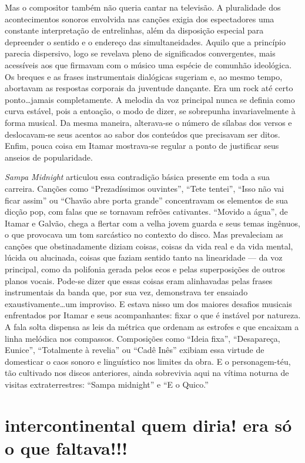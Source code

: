 Mas o compositor também não queria cantar na televisão. A pluralidade
dos acontecimentos sonoros envolvida nas canções exigia dos espectadores
uma constante interpretação de entrelinhas, além da disposição especial
para depreender o sentido e o endereço das simultaneidades. Aquilo que a
princípio parecia dispersivo, logo se revelava pleno de significados
convergentes, mais acessíveis aos que firmavam com o músico uma espécie
de comunhão ideológica. Os breques e as frases instrumentais dialógicas
sugeriam e, ao mesmo tempo, abortavam as respostas corporais da
juventude dançante. Era um rock até certo ponto\ldots jamais completamente.
A melodia da voz principal nunca se definia como curva estável, pois a
entoação, o modo de dizer, se sobrepunha invariavelmente à forma
musical. Da mesma maneira, alterava-se o número de sílabas dos versos e
deslocavam-se seus acentos ao sabor dos conteúdos que precisavam ser
ditos. Enfim, pouca coisa em Itamar mostrava-se regular a ponto de
justificar seus anseios de popularidade.

\textit{Sampa Midnight} articulou essa contradição básica presente em toda a sua
carreira. Canções como ``Prezadíssimos ouvintes'', ``Tete tentei'', ``Isso não vai
ficar assim'' ou ``Chavão abre porta grande'' concentravam os elementos de sua
dicção pop, com falas que se tornavam refrões cativantes. ``Movido a água'', de Itamar e Galvão, chega a flertar com a velha jovem guarda e seus temas
ingênuos, o que provocava um tom sarcástico no contexto do disco. Mas
prevaleciam as canções que obstinadamente diziam coisas, coisas da vida
real e da vida mental, lúcida ou alucinada, coisas que faziam sentido
tanto na linearidade --- da voz principal, como da polifonia gerada pelos
ecos e pelas superposições de outros planos vocais. Pode-se dizer que
essas coisas eram alinhavadas pelas frases instrumentais da banda que,
por sua vez, demonstrava ter ensaiado exaustivamente\ldots um improviso. E
estava nisso um dos maiores desafios musicais enfrentados por Itamar e
seus acompanhantes: fixar o que é instável por natureza. A fala solta
dispensa as leis da métrica que ordenam as estrofes e que encaixam a
linha melódica nos compassos. Composições como ``Ideia fixa'', ``Desapareça,
Eunice'', ``Totalmente à revelia'' ou ``Cadê Inês'' exibiam essa virtude de
domesticar o caos sonoro e linguístico nos limites da obra. E o
personagem-téu, tão cultivado nos discos anteriores, ainda sobrevivia
aqui na vítima noturna de visitas extraterrestres: ``Sampa midnight'' e ``E o
Quico.''

\section{intercontinental quem diria! era só o que faltava!!!}

